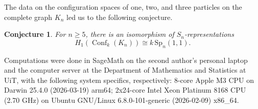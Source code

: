 \documentclass[12pt]{amsart}
\newtheorem{conjecture}[thm]{Conjecture}
\theoremstyle{definition}
\newcommand{\conf}{\operatorname{Conf}}
\newcommand{\Sp}{\mathrm{Sp}}
\newcommand{\cy}[1]{\textcolor{red}{#1}}
\begin{document}

The data on the configuration spaces of one, two, and three particles on the complete graph $K_n$ led us to the following conjecture.
\begin{conjecture}
    For $n\geq 5$, there is an isomorphism of $S_n$-representations \[H_1(\conf_k(K_n))\cong k\,\Sp_n(1,1).\]
\end{conjecture}

Computations were done in SageMath\cite{sagemath} on the second author's personal laptop and the computer server at the Department of Mathematics and Statistics at UiT, with the
following system specifics, respectively: 8-core Apple M3 CPU on Darwin 25.4.0 (2026-03-19) arm64; 2x24-core Intel Xeon Platinum 8168 CPU (2.70 GHz) on Ubuntu GNU/Linux 6.8.0-101-generic (2026-02-09) x86\_64.
%







\end{document}
